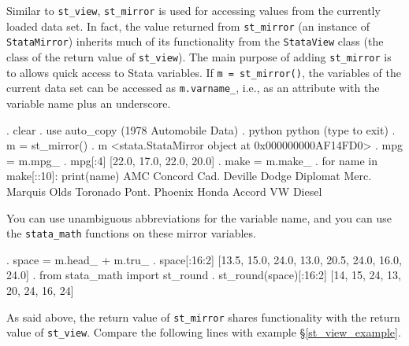 \documentclass{article}
\begin{document}
Similar to \lstinline{st_view}, \lstinline{st_mirror} is used for accessing values from the currently loaded data set. In fact, the value returned from \lstinline{st_mirror} (an instance of \lstinline$StataMirror$) inherits much of its functionality from the \lstinline$StataView$ class (the class of the return value of \lstinline{st_view}). The main purpose of adding \lstinline{st_mirror} is to allows quick access to Stata variables. If \lstinline{m = st_mirror()}, the variables of the current data set can be accessed as \lstinline{m.varname_}, i.e., as an attribute with the variable name plus an underscore.

\begin{stlog}
. clear
{\smallskip}
. use auto_copy
(1978 Automobile Data)
{\smallskip}
. python
 python (type {} to exit) 
{\bftt{>>>}}. m = st_mirror()
{\smallskip}
{\bftt{>>>}}. m
<stata.StataMirror object at 0x000000000AF14FD0>
{\smallskip}
{\bftt{>>>}}. mpg = m.mpg_
{\smallskip}
{\bftt{>>>}}. mpg[:4]
[22.0, 17.0, 22.0, 20.0]
{\smallskip}
{\bftt{>>>}}. make = m.make_
{\smallskip}
{\bftt{>>>}}. for name in make[::10]: print(name)
AMC Concord
Cad. Deville
Dodge Diplomat
Merc. Marquis
Olds Toronado
Pont. Phoenix
Honda Accord
VW Diesel

\end{stlog}

\medskip

You can use unambiguous abbreviations for the variable name, and you can use the \lstinline{stata_math} functions on these mirror variables.

\begin{stlog}
{\bftt{>>>}}. space = m.head_ + m.tru_
{\smallskip}
{\bftt{>>>}}. space[:16:2]
[13.5, 15.0, 24.0, 13.0, 20.5, 24.0, 16.0, 24.0]
{\smallskip}
{\bftt{>>>}}. from stata_math import st_round
{\smallskip}
{\bftt{>>>}}. st_round(space)[:16:2]
[14, 15, 24, 13, 20, 24, 16, 24]
{\smallskip}
\end{stlog}

\medskip

As said above, the return value of \lstinline{st_mirror} shares functionality with the return value of \lstinline{st_view}. Compare the following lines with example \S\ref{st_view_example}.
\end{document}
